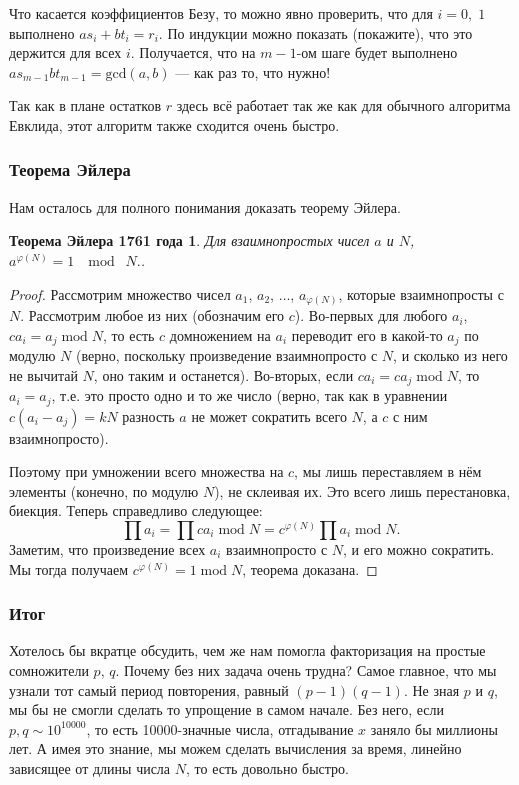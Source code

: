 \documentclass[12pt]{article}
\newtheorem*{euler}{Теорема Эйлера 1761 года}
\begin{document}
Что касается коэффициентов Безу, то можно явно проверить, что для $i = 0,\;1$ выполнено $a s_i + b t_i = r_i$. По индукции можно показать (покажите), что это держится для всех $i$. Получается, что на $m - 1$-ом шаге будет выполнено $a s_{m - 1} b t_{m - 1} = \mbox{gcd}(a, b)$ --- как раз то, что нужно!

Так как в плане остатков $r$ здесь всё работает так же как для обычного алгоритма Евклида, этот алгоритм также сходится очень быстро.

\subsubsection*{Теорема Эйлера}
Нам осталось для полного понимания доказать теорему Эйлера. 

\begin{euler}
Для взаимнопростых чисел $a$ и $N$, $a^{\varphi(N)} = 1\;\mod\;N.$.
\end{euler}

\begin{proof}
Рассмотрим множество чисел $a_1$, $a_2$, $\ldots$, $a_{\varphi(N)}$, которые взаимнопросты с $N$. Рассмотрим любое из них (обозначим его $c$). Во-первых для любого $a_i$, $c a_i = a_j\;\mbox{mod}\;N$, то есть $c$ домножением на $a_i$ переводит его в какой-то $a_j$ по модулю $N$ (верно, поскольку произведение взаимнопросто с $N$, и сколько из него не вычитай $N$, оно таким и останется). Во-вторых, если $c a_i = c a_j\;\mbox{mod}\;N$, то $a_i = a_j$, т.е. это просто одно и то же число (верно, так как в уравнении $c (a_i - a_j) = k N$ разность $a$ не может сократить всего $N$, а $c$ с ним взаимнопросто).

Поэтому при умножении всего множества на $c$, мы лишь переставляем в нём элементы (конечно, по модулю $N$), не склеивая их. Это всего лишь перестановка, биекция. Теперь справедливо следующее: $$\prod a_i = \prod c a_i\;\mbox{mod}\;N = c^{\varphi(N)} \prod a_i\;\mbox{mod}\;N.$$
Заметим, что произведение всех $a_i$ взаимнопросто с $N$, и его можно сократить. Мы тогда получаем $c^{\varphi(N)} = 1\;\mbox{mod}\;N$, теорема доказана.
\end{proof}

\subsubsection*{Итог}
Хотелось бы вкратце обсудить, чем же нам помогла факторизация на простые сомножители $p$, $q$. Почему без них задача очень трудна? Самое главное, что мы узнали тот самый период повторения, равный $(p - 1)(q - 1)$. Не зная $p$ и $q$, мы бы не смогли сделать то упрощение в самом начале. Без него, если $p, q \sim 10^{10000}$, то есть 10000-значные числа, отгадывание $x$ заняло бы миллионы лет. А имея это знание, мы можем сделать вычисления за время, линейно зависящее от длины числа $N$, то есть довольно быстро.
\end{document}
